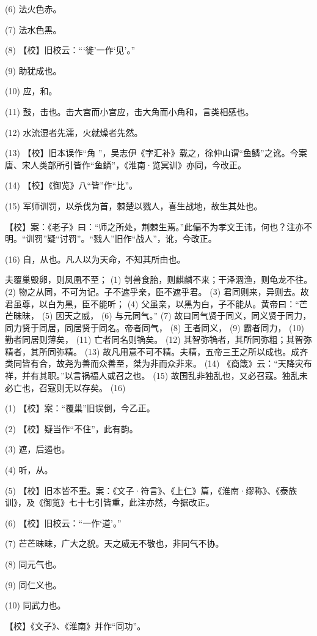 \documentclass[12pt,UTF8]{ctexbook}
\begin{document}
(6) 法火色赤。

(7) 法水色黑。

(8) 【校】旧校云：“‘徙’一作‘见’。”

(9) 助犹成也。

(10) 应，和。

(11) 鼓，击也。击大宫而小宫应，击大角而小角和，言类相感也。

(12) 水流湿者先濡，火就燥者先然。

(13) 【校】旧本误作“角 ”，吴志伊《字汇补》载之，徐仲山谓“鱼鳞”之讹。今案唐、宋人类部所引皆作“鱼鳞”，《淮南·览冥训》亦同，今改正。

(14) 【校】《御览》八“皆”作“比”。

(15) 军师训罚，以杀伐为首，棘楚以戮人，喜生战地，故生其处也。

【校】案：《老子》曰：“师之所处，荆棘生焉。”此偏不为孝文王讳，何也？注亦不明。“训罚”疑“讨罚”。“戮人”旧作“战人”，讹，今改正。

(16) 自，从也。凡人以为天命，不知其所由也。

夫覆巢毁卵，则凤凰不至； (1) 刳兽食胎，则麒麟不来；干泽涸渔，则龟龙不往。 (2) 物之从同，不可为记。子不遮乎亲，臣不遮乎君。 (3) 君同则来，异则去。故君虽尊，以白为黑，臣不能听； (4) 父虽亲，以黑为白，子不能从。黄帝曰：“芒芒昧昧， (5) 因天之威， (6) 与元同气。” (7) 故曰同气贤于同义，同义贤于同力，同力贤于同居，同居贤于同名。帝者同气， (8) 王者同义， (9) 霸者同力， (10) 勤者同居则薄矣， (11) 亡者同名则觕矣。 (12) 其智弥觕者，其所同弥粗；其智弥精者，其所同弥精。 (13) 故凡用意不可不精。夫精，五帝三王之所以成也。成齐类同皆有合，故尧为善而众善至，桀为非而众非来。 (14) 《商箴》云：“天降灾布祥，并有其职。”以言祸福人或召之也。 (15) 故国乱非独乱也，又必召寇。独乱未必亡也，召寇则无以存矣。 (16)

(1) 【校】案：“覆巢”旧误倒，今乙正。

(2) 【校】疑当作“不住”，此有韵。

(3) 遮，后遏也。

(4) 听，从。

(5) 【校】旧本皆不重。案：《文子·符言》、《上仁》篇，《淮南·缪称》、《泰族训》，及《御览》七十七引皆重，此注亦然，今据改正。

(6) 【校】旧校云：“一作‘道’。”

(7) 芒芒昧昧，广大之貌。天之威无不敬也，非同气不协。

(8) 同元气也。

(9) 同仁义也。

(10) 同武力也。

【校】《文子》、《淮南》并作“同功”。
\end{document}

